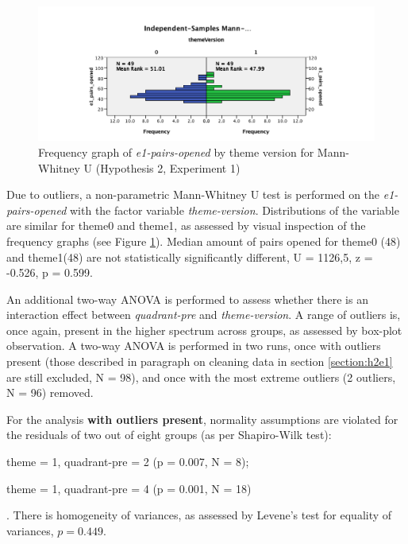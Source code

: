		\begin{figure}
			\centering
			\includegraphics[width=1\linewidth]{graphics/H2E1-MannWhitneyU}
			\caption{Frequency graph of \textit{e1-pairs-opened} by theme version for Mann-Whitney U (Hypothesis 2, Experiment 1)}
			\label{fig:h2e1-mannwhitneyu}
		\end{figure}
		
		Due to outliers, a non-parametric Mann-Whitney U test is performed on the \textit{e1-pairs-opened} with the factor variable \textit{theme-version}. Distributions of the variable are similar for theme0 and theme1, as assessed by visual inspection of the frequency graphs (see Figure \ref{fig:h2e1-mannwhitneyu}). Median amount of pairs opened for theme0 (48) and theme1(48) are not statistically significantly different, U = 1126,5, z = -0.526, p = 0.599.
		
		An additional two-way ANOVA is performed to assess whether there is an interaction effect between \textit{quadrant-pre} and \textit{theme-version}. A range of outliers is, once again, present in the higher spectrum across groups, as assessed by box-plot observation. A two-way ANOVA is performed in two runs, once with outliers present (those described in paragraph on cleaning data in section \ref{section:h2e1} are still excluded, N = 98), and once with the most extreme outliers (2 outliers, N = 96) removed.
		
		For the analysis \textbf{with outliers present}, normality assumptions are violated for the residuals of two out of eight groups (as per Shapiro-Wilk test): 
		\begin{itemize*}
			\item theme = 1, quadrant-pre = 2 (p = 0.007, N = 8);
			\item theme = 1, quadrant-pre = 4 (p = 0.001, N = 18)
		\end{itemize*}. 
		There is homogeneity of variances, as assessed by Levene's test for equality of variances, $ p = 0.449 $.
		
